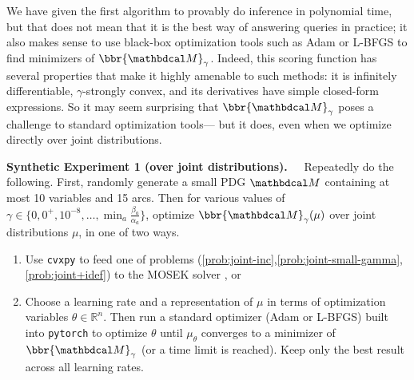 We have given the first algorithm to provably do inference in polynomial
time, but that does not mean that it is the best way of answering queries in practice;
it also makes sense to use black-box optimization tools such as
    Adam \parencite{kingma2014adam} or L-BFGS \parencite{fletcher2013practical}
    to find minimizers of $\bbr{\dg M}_\gamma$.
Indeed, this scoring function has several properties
    that make it highly amenable to such methods: it is
    infinitely differentiable, $\gamma$-strongly convex, and its
    derivatives have simple closed-form expressions.
So it may seem surprising that $\bbr{\dg M}_\gamma$ poses
a challenge to standard optimization tools---%
but it does, 
even when we optimize directly over joint distributions.



\textbf{Synthetic Experiment 1 ({\normalfont over joint distributions}).~~} 
Repeatedly do the following.
First, randomly generate a small PDG $\dg M$ containing 
at most 10 variables and 15 arcs. 
Then for various values of
$\gamma \in \{0, 0^+, 
    10^{-8}, 
     \ldots, \min_a \frac{\beta_a}{\alpha_a} \}$,
optimize $\bbr{\dg M}_\gamma(\mu)$ over joint distributions $\mu$, 
in one of two ways. 
\begin{enumerate}[wide,label=(\alph*),nosep,itemsep=0.2ex]
\item Use \verb|cvxpy| \parencite{diamond2016cvxpy}
to feed  
one of problems (\ref{prob:joint-inc},\ref{prob:joint-small-gamma},\ref{prob:joint+idef})
    to the MOSEK solver \parencite{mosek}, or
\item Choose a learning rate and a representation of $\mu$ in terms of optimization variables $\theta \in \mathbb R^n$.
    Then run a standard optimizer (Adam or L-BFGS) built into \verb|pytorch| \parencite{pytorch}
    to optimize $\theta$
    until $\mu_\theta$ converges to a minimizer of $\bbr{\dg M}_\gamma$ 
        (or a time limit is reached).
    Keep only the best result across all learning rates. 
\end{enumerate}

